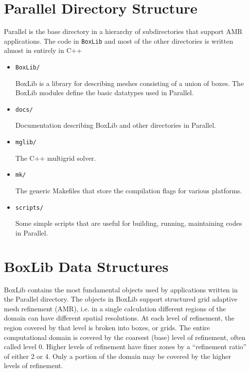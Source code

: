 \section{Parallel Directory Structure}

Parallel is the base directory in a hierarchy of subdirectories that
support AMR applications.  The code in {\tt BoxLib} and most of the
other directories is written almost in entirely in C++ 

\begin{itemize}
\item {\tt BoxLib/} 

 BoxLib is a library for describing meshes consisting of a union
 of boxes.  The BoxLib modules define the basic datatypes used
 in Parallel.

\item {\tt docs/}

 Documentation describing BoxLib and other directories in Parallel.

\item {\tt mglib/}

  The C++ multigrid solver.

\item {\tt mk/}

  The generic Makefiles that store the compilation flags for
  various platforms.

\item {\tt scripts/}

  Some simple scripts that are useful for building, running,
  maintaining codes in Parallel.

\end{itemize}

\section{BoxLib Data Structures}

BoxLib contains the most fundamental objects used by applications written
in the Parallel directory. The objects in BoxLib support structured
grid adaptive mesh refinement (AMR), i.e. in a single calculation
different regions of the domain can have different spatial resolutions.  
At each level of refinement, the region covered by that level is broken
into boxes, or grids.  The entire computational domain is covered by
the coarsest (base) level of refinement, often called level 0. 
Higher levels of refinement have finer zones by a ``refinement ratio''
of either 2 or 4.  Only a portion of the domain may
be covered by the higher levels of refinement.  


